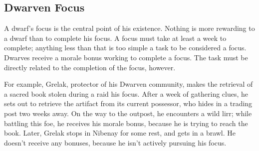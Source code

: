 \subsection{Dwarven Focus}

A dwarf's focus is the central point of his existence. Nothing is more rewarding to a dwarf than to complete his focus. A focus must take at least a week to complete; anything less than that is too simple a task to be considered a focus. Dwarves receive a morale bonus working to complete a focus. The task must be directly related to the completion of the focus, however.

For example, Grelak, protector of his Dwarven community, makes the retrieval of a sacred book stolen during a raid his focus. After a week of gathering clues, he sets out to retrieve the artifact from its current possessor, who hides in a trading post two weeks away. On the way to the outpost, he encounters a wild lirr; while battling this foe, he receives his morale bonus, because he is trying to reach the book. Later, Grelak stops in Nibenay for some rest, and gets in a brawl. He doesn't receive any bonuses, because he isn't actively pursuing his focus.

